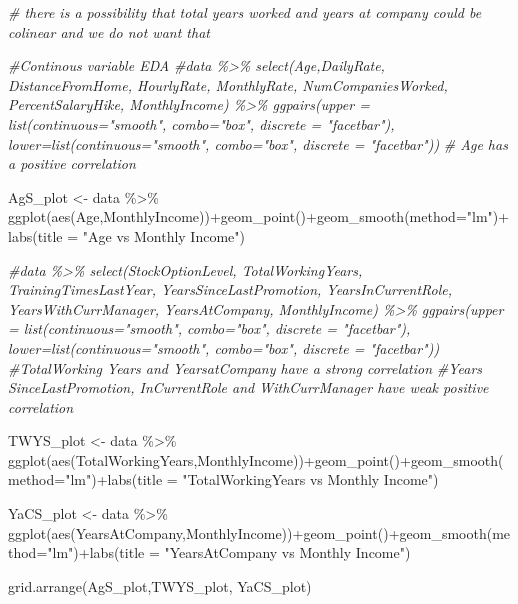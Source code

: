 \documentclass[
]{article}
\newenvironment{Shaded}{\begin{snugshade}}{\end{snugshade}}
\newcommand{\AttributeTok}[1]{\textcolor[rgb]{0.77,0.63,0.00}{#1}}
\newcommand{\CommentTok}[1]{\textcolor[rgb]{0.56,0.35,0.01}{\textit{#1}}}
\newcommand{\FunctionTok}[1]{\textcolor[rgb]{0.00,0.00,0.00}{#1}}
\newcommand{\NormalTok}[1]{#1}
\newcommand{\OtherTok}[1]{\textcolor[rgb]{0.56,0.35,0.01}{#1}}
\newcommand{\SpecialCharTok}[1]{\textcolor[rgb]{0.00,0.00,0.00}{#1}}
\newcommand{\StringTok}[1]{\textcolor[rgb]{0.31,0.60,0.02}{#1}}
\begin{document}
\begin{Shaded}
\begin{Highlighting}[]
\CommentTok{\# there is a possibility that total years worked and years at company could be colinear and we do not want that}

\CommentTok{\#Continous variable EDA}
\CommentTok{\#data \%\textgreater{}\% select(Age,DailyRate, DistanceFromHome, HourlyRate, MonthlyRate, NumCompaniesWorked, PercentSalaryHike, MonthlyIncome) \%\textgreater{}\% ggpairs(upper = list(continuous="smooth", combo="box", discrete = "facetbar"), lower=list(continuous="smooth", combo="box", discrete = "facetbar"))}
\CommentTok{\# Age has a positive correlation}

\NormalTok{AgS\_plot }\OtherTok{\textless{}{-}}\NormalTok{ data }\SpecialCharTok{\%\textgreater{}\%} \FunctionTok{ggplot}\NormalTok{(}\FunctionTok{aes}\NormalTok{(Age,MonthlyIncome))}\SpecialCharTok{+}\FunctionTok{geom\_point}\NormalTok{()}\SpecialCharTok{+}\FunctionTok{geom\_smooth}\NormalTok{(}\AttributeTok{method=}\StringTok{"lm"}\NormalTok{)}\SpecialCharTok{+}\FunctionTok{labs}\NormalTok{(}\AttributeTok{title =} \StringTok{"Age vs Monthly Income"}\NormalTok{)}

\CommentTok{\#data \%\textgreater{}\% select(StockOptionLevel, TotalWorkingYears, TrainingTimesLastYear, YearsSinceLastPromotion, YearsInCurrentRole, YearsWithCurrManager, YearsAtCompany, MonthlyIncome) \%\textgreater{}\% ggpairs(upper = list(continuous="smooth", combo="box", discrete = "facetbar"), lower=list(continuous="smooth", combo="box", discrete = "facetbar"))}
\CommentTok{\#TotalWorking Years and YearsatCompany have a strong correlation}
\CommentTok{\#Years SinceLastPromotion, InCurrentRole and WithCurrManager have weak positive correlation}

\NormalTok{TWYS\_plot }\OtherTok{\textless{}{-}}\NormalTok{ data }\SpecialCharTok{\%\textgreater{}\%} \FunctionTok{ggplot}\NormalTok{(}\FunctionTok{aes}\NormalTok{(TotalWorkingYears,MonthlyIncome))}\SpecialCharTok{+}\FunctionTok{geom\_point}\NormalTok{()}\SpecialCharTok{+}\FunctionTok{geom\_smooth}\NormalTok{(}\AttributeTok{method=}\StringTok{"lm"}\NormalTok{)}\SpecialCharTok{+}\FunctionTok{labs}\NormalTok{(}\AttributeTok{title =} \StringTok{"TotalWorkingYears vs Monthly Income"}\NormalTok{)}

\NormalTok{YaCS\_plot }\OtherTok{\textless{}{-}}\NormalTok{ data }\SpecialCharTok{\%\textgreater{}\%} \FunctionTok{ggplot}\NormalTok{(}\FunctionTok{aes}\NormalTok{(YearsAtCompany,MonthlyIncome))}\SpecialCharTok{+}\FunctionTok{geom\_point}\NormalTok{()}\SpecialCharTok{+}\FunctionTok{geom\_smooth}\NormalTok{(}\AttributeTok{method=}\StringTok{"lm"}\NormalTok{)}\SpecialCharTok{+}\FunctionTok{labs}\NormalTok{(}\AttributeTok{title =} \StringTok{"YearsAtCompany vs Monthly Income"}\NormalTok{)}

\FunctionTok{grid.arrange}\NormalTok{(AgS\_plot,TWYS\_plot, YaCS\_plot)}
\end{Highlighting}
\end{Shaded}
\end{document}
